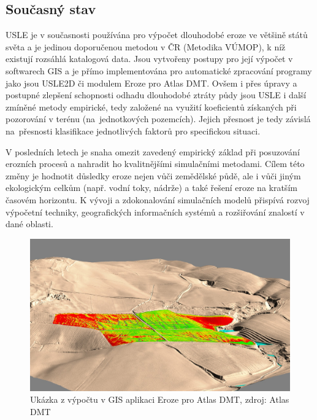 \newpage
\subsection{Současný stav}
USLE je v současnosti používána pro výpočet dlouhodobé eroze ve
většině států světa a je jedinou doporučenou metodou v ČR (Metodika
VÚMOP\cite{janecek2012}), k níž \hbox{existují} rozsáhlá katalogová data. Jsou
vytvořeny postupy pro její výpočet v softwarech GIS a je přímo
implementována pro automatické zpracování programy jako jsou USLE2D či
modulem Eroze pro Atlas DMT. Ovšem i přes úpravy a postupné zlepšení
schopnosti odhadu dlouhodobé ztráty půdy jsou USLE i další zmíněné
metody \hbox{empirické}, tedy založené na využití koeficientů získaných při
pozorování v terénu (na~jednotkových pozemcích). Jejich přesnost je
tedy závislá na~přesnosti klasifikace jednotlivých faktorů pro
specifickou situaci.

V posledních letech je snaha omezit zavedený empirický základ při
posuzování erozních procesů a nahradit ho kvalitnějšími simulačními
metodami. Cílem této změny je hodnotit důsledky eroze nejen vůči
zemědělské půdě, ale i vůči jiným ekologickým celkům (např. vodní
toky, nádrže) a také řešení eroze na kratším časovém horizontu.  K
vývoji a zdokonalování simulačních modelů přispívá rozvoj výpočetní
techniky, geografických informačních systémů a rozšiřování znalostí v
dané oblasti.\cite{janecek2012}
\begin{figure}[H]
    \centering
    \includegraphics[scale=0.25]{./pictures/atlas_eroze.jpg}
      \caption[Ukázka z výpočtu v GIS aplikaci Eroze pro Atlas
        DMT]{Ukázka z výpočtu v GIS aplikaci Eroze pro Atlas DMT,
        zdroj: Atlas DMT\cite{atlas_e}}
      \label{fig:atlas_eroze}
\end{figure}

